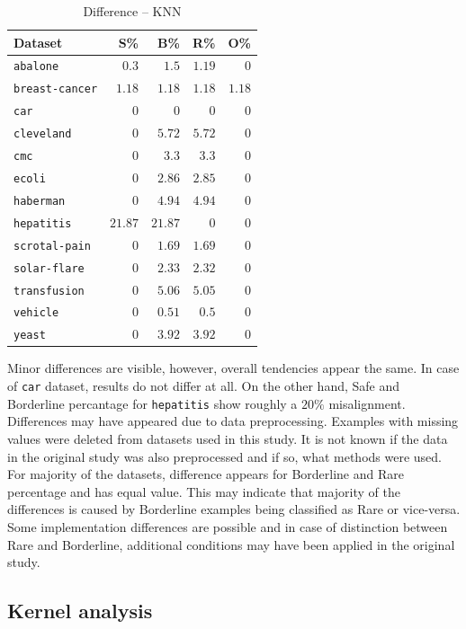 \documentclass[12pt]{article}
\begin{document}
\begin{table}[H]
\begin{minipage}{0.5\textwidth}
\begin{tabular}{lrrrr}
    \toprule
    Dataset & S\% & B\% & R\% & O\% \\ \midrule
    \texttt{abalone} & $0.3$ & $1.5$ & $1.19$ & $0$\\
    \texttt{breast-cancer} & $1.18$ & $1.18$ & $1.18$ & $1.18$ \\
    \texttt{car} & $0$ & $0$ & $0$ & $0$ \\
    \texttt{cleveland} & $0$ & $5.72$ & $5.72$ & $0$ \\
    \texttt{cmc} & $0$ & $3.3$ & $3.3$ & $0$ \\
    \texttt{ecoli} & $0$ & $2.86$ & $2.85$ & $0$ \\
    \texttt{haberman} & $0$ & $4.94$ & $4.94$ & $0$ \\
    \texttt{hepatitis} & $21.87$ & $21.87$ & $0$ & $0$ \\
    \texttt{scrotal-pain} & $0$ & $1.69$ & $1.69$ & $0$ \\
    \texttt{solar-flare} & $0$ & $2.33$ & $2.32$ & $0$ \\
    \texttt{transfusion} & $0$ & $5.06$ & $5.05$ & $0$ \\
    \texttt{vehicle} & $0$ & $0.51$ & $0.5$ & $0$ \\
    \texttt{yeast} & $0$ & $3.92$ & $3.92$ & $0$ \\
    \bottomrule
\end{tabular}
\caption{Difference -- KNN}
\label{tab:knn_diff}
\end{minipage}
\end{table}

Minor differences are visible, however, overall tendencies appear the same. In case of \texttt{car} dataset, results do not differ at all. On the other hand, Safe and Borderline percantage for \texttt{hepatitis} show roughly a $20\%$ misalignment. Differences may have appeared due to data preprocessing. Examples with missing values were deleted from datasets used in this study. It is not known if the data in the original study was also preprocessed and if so, what methods were used. For majority of the datasets, difference appears for Borderline and Rare percentage and has equal value. This may indicate that majority of the differences is caused by Borderline examples being classified as Rare or vice-versa. Some implementation differences are possible and in case of distinction between Rare and Borderline, additional conditions may have been applied in the original study.
\subsection{Kernel analysis}
\end{document}

